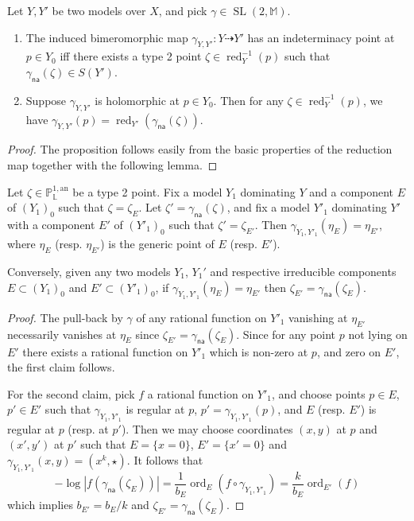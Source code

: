 \documentclass[AHL,Unicode,longabstracts]{cedram}
\DeclareMathOperator{\red}{red}
\DeclareMathOperator{\ord}{ord}
\DeclareMathOperator{\SL}{SL}
\newcommand{\mm}{\mathbb{M}}
\newcommand{\an}{\mathrm{an}}
\newcommand{\berkl}{\mathbb P^{1,\an}_{\Laurent}}
\newcommand{\Laurent}{\mathbb{L}}
\newcommand{\na}{\mathsf{na}}
\begin{document}
\begin{prop}\label{prop:val-geom}
Let $Y,Y'$ be two models over $X$, and pick $\gamma\in \SL(2,\mm)$.
\begin{enumerate}
\item The induced bimeromorphic map $\gamma_{Y,Y'}: Y \dashrightarrow Y'$ has an indeterminacy point at $p\in Y_0$ iff there exists a type 2 point $\zeta \in \red^{-1}_{Y}(p)$ such that $\gamma_\na(\zeta) \in S(Y')$.
\item Suppose $\gamma_{Y,Y'}$ is holomorphic at $p\in Y_0$. Then for any $\zeta \in \red_{Y}^{-1}(p)$, we have $\gamma_{Y,Y'}(p) = \red_{Y'} (\gamma_\na(\zeta))$.
\end{enumerate}
\end{prop}

\begin{proof}
The proposition follows easily from the basic properties of the reduction map together with the following lemma.
\end{proof}

\begin{lemm}
Let $\zeta\in\berkl$ be a type 2 point. Fix a model $Y_1$ dominating $Y$ and a component $E$ of $(Y_1)_0$ such that $\zeta = \zeta_E$. Let $\zeta' = \gamma_\na(\zeta)$, and fix a model $Y'_1$ dominating $Y'$ with a component $E'$ of $(Y'_1)_0$ such that $\zeta' = \zeta_{E'}$. Then $\gamma_{Y_1, Y'_1}(\eta_E) = \eta_{E'}$, where $\eta_E$ (resp. $\eta_{E'}$) is the generic point of $E$ (resp. $E'$).

Conversely, given any two models $Y_1$, $Y_1'$ and respective irreducible components $E \subset (Y_1)_0$ and $E' \subset (Y'_1)_0$, if $\gamma_{Y_1, Y'_1}(\eta_E) = \eta_{E'}$ then $\zeta_{E'} = \gamma_\na(\zeta_{E})$.
\end{lemm}

\begin{proof}
The pull-back by $\gamma$ of any rational function on $Y'_1$ vanishing at $\eta_{E'}$ necessarily vanishes at $\eta_E$ since $\zeta_{E'} = \gamma_\na(\zeta_E)$. Since for any point $p$ not lying on $E'$ there exists a rational function on $Y'_1$ which is non-zero at $p$, and zero on $E'$, the first claim follows.

For the second claim, pick $f$ a rational function on $Y'_1$, and choose points $p\in E$, $p'\in E'$ such that $\gamma_{Y_1, Y'_1}$ is regular at $p$, $p' = \gamma_{Y_1, Y'_1}(p)$, and $E$ (resp. $E'$) is regular at $p$ (resp. at $p'$). Then we may choose coordinates $(x,y)$ at $p$ and $(x',y')$ at $p'$ such that $E = \{ x=0\}$, $E' = \{ x'=0\}$ and $\gamma_{Y_1, Y'_1} (x,y) = (x^k, \star)$. It follows that
\[
-\log|f(\gamma_\na(\zeta_{E}))| = \frac1{b_E}\ord_{E}(f \circ \gamma_{Y_1, Y'_1}) = \frac{k}{b_E}\ord_{E'}(f)
\]
which implies $ b_{E'} = b_E/k$ and $\zeta_{E'} = \gamma_\na(\zeta_{E})$.
\end{proof}
\end{document}
